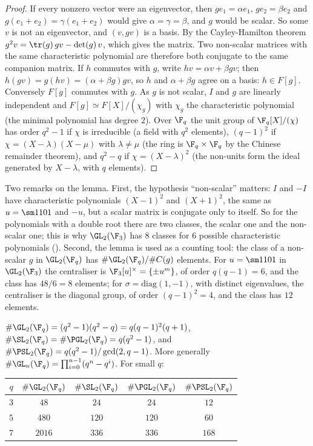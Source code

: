 \begin{proof}
If every nonzero vector were an eigenvector, then $ge_1=\alpha e_1$, $ge_2=\beta e_2$ and $g(e_1+e_2)=\gamma(e_1+e_2)$ would give $\alpha=\gamma=\beta$, and $g$ would
be scalar. So some $v$ is not an eigenvector, and $(v,gv)$ is a basis. By the Cayley-Hamilton theorem $g^2v=\tr(g)\,gv-\det(g)\,v$, which gives the
matrix. Two non-scalar matrices with the same characteristic polynomial are therefore both conjugate to the same companion matrix. If $h$
commutes with $g$, write $hv=\alpha v+\beta gv$; then $h(gv)=g(hv)=(\alpha+\beta g)gv$, so $h$ and $\alpha+\beta g$ agree on a basis: $h\in F[g]$. Conversely $F[g]$
commutes with $g$. As $g$ is not scalar, $I$ and $g$ are linearly independent and $F[g]\simeq F[X]/(\chi_g)$ with $\chi_g$ the characteristic polynomial
(the minimal polynomial has degree $2$). Over $\F_q$ the unit group of $\F_q[X]/(\chi)$ has order $q^2-1$ if $\chi$ is irreducible (a field with $q^2$
elements), $(q-1)^2$ if $\chi=(X-\lambda)(X-\mu)$ with $\lambda\ne\mu$ (the ring is $\F_q\times\F_q$ by the Chinese remainder theorem), and $q^2-q$ if $\chi=(X-\lambda)^2$
(the non-units form the ideal generated by $X-\lambda$, with $q$ elements).
\end{proof}

Two remarks on the lemma. First, the hypothesis ``non-scalar'' matters: $I$ and $-I$ have characteristic polynomials $(X-1)^2$ and $(X+1)^2$, the same as $u=\sm1101$
and $-u$, but a scalar matrix is conjugate only to itself. So for the polynomials with a double root there are two classes, the scalar one and the non-scalar
one; this is why $\GL_2(\F_3)$ has $8$ classes for $6$ possible characteristic polynomials (). Second, the lemma is used as a
counting tool: the class of a non-scalar $g$ in $\GL_2(\F_q)$ has $\#\GL_2(\F_q)/\#C(g)$ elements. For $u=\sm1101$ in $\GL_2(\F_3)$ the centraliser is
$\F_3[u]^\times=\{\pm u^m\}$, of order $q(q-1)=6$, and the class has $48/6=8$ elements; for $\sigma=\mathrm{diag}(1,-1)$, with distinct eigenvalues, the centraliser is the
diagonal group, of order $(q-1)^2=4$, and the class has $12$ elements.

\begin{proposition}[Orders]\label{prop:groups:orders}
$\#\GL_2(\F_q)=(q^2-1)(q^2-q)=q(q-1)^2(q+1)$, $\#\SL_2(\F_q)=\#\PGL_2(\F_q)=q(q^2-1)$, and $\#\PSL_2(\F_q)=q(q^2-1)/\gcd(2,q-1)$. More generally
$\#\GL_n(\F_q)=\prod_{i=0}^{n-1}(q^n-q^i)$. For small $q$:
\begin{center}
\begin{tabular}{ccccc}
\toprule
$q$ & $\#\GL_2(\F_q)$ & $\#\SL_2(\F_q)$ & $\#\PGL_2(\F_q)$ & $\#\PSL_2(\F_q)$\\
\midrule
$3$ & $48$ & $24$ & $24$ & $12$\\
$5$ & $480$ & $120$ & $120$ & $60$\\
$7$ & $2016$ & $336$ & $336$ & $168$\\
\bottomrule
\end{tabular}
\end{center}
\end{proposition}

